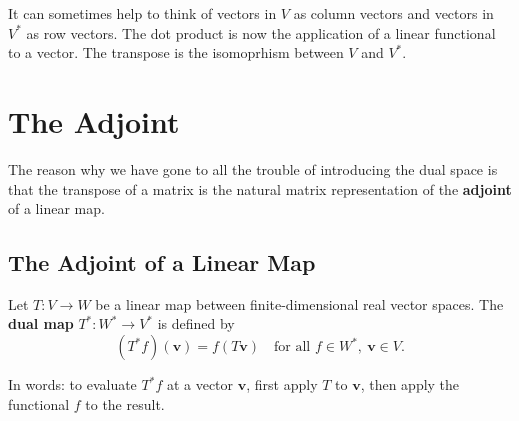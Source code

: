 \documentclass[11pt]{article}
\begin{document}
It can sometimes help to think of vectors in $V$ as column vectors and vectors in $V^*$ as row vectors. The dot product is now the application of a linear functional to a vector. The transpose is the isomoprhism between $V$ and $V^*$. 



















\section*{\huge The Adjoint}

The reason why we have gone to all the trouble of introducing the dual space is that the transpose of a matrix is the natural matrix representation of the \textbf{adjoint} of a linear map. 

\subsection*{\Large The Adjoint of a Linear Map}

Let $ T: V \to W $ be a linear map between finite-dimensional real vector spaces.  
The \textbf{dual map} $ T^*: W^* \to V^* $ is defined by
\[
(T^* f)(\mathbf{v}) = f(T\mathbf{v}) \quad \text{for all } f \in W^*,\ \mathbf{v} \in V.
\]

In words: to evaluate $ T^* f $ at a vector $ \mathbf{v} $, first apply $ T $ to $ \mathbf{v} $, then apply the functional $ f $ to the result.  
\end{document}
